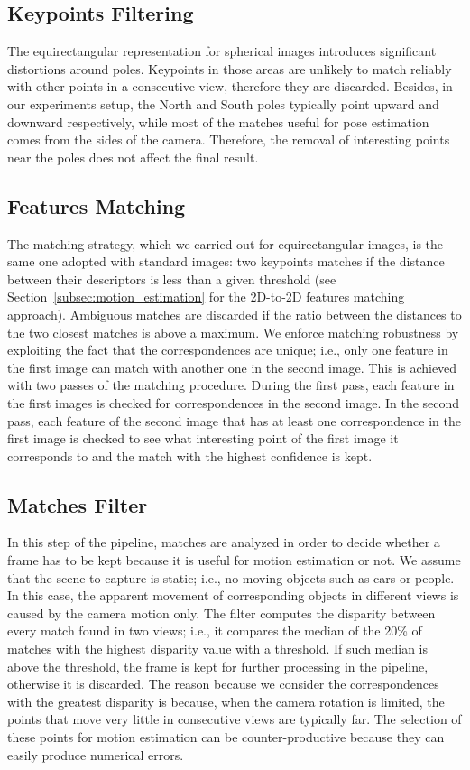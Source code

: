 \subsection{Keypoints Filtering}
The equirectangular representation for spherical images introduces significant 
distortions around poles. Keypoints in those areas 
are unlikely to match reliably with other points in a consecutive view, therefore they are discarded.
Besides, in our experiments setup, the North and South poles typically point 
upward and downward respectively, while most of the matches useful for pose 
estimation comes from the sides of the camera. Therefore, the removal of interesting 
points near the poles does not affect the final result.

\subsection{Features Matching}\label{subsec:feature_matching}
The matching strategy, which we carried out for equirectangular images, is the same one 
adopted with standard images: two keypoints matches if the distance between 
their descriptors is less than a given threshold
(see Section~\ref{subsec:motion_estimation} for the 2D-to-2D features matching
approach). Ambiguous matches 
are discarded if the ratio between the distances to the two closest matches is 
above a maximum.
We enforce matching robustness by exploiting the fact that the correspondences are unique; i.e., only one feature in the first image can match with another one in the second image. This is achieved with two passes of the matching procedure. During the 
first pass, each feature in the first images is checked for correspondences in
the second image. In the second pass, each feature of the second image that 
has at least one correspondence in the first image is checked to see what 
interesting point of the first image it corresponds to and the match with the
highest confidence is kept.

\subsection{Matches Filter}
In this step of the pipeline, matches are analyzed in order to decide 
whether a frame has to be kept because it is useful for motion estimation or
not.
%
We assume that the scene to capture is static; i.e., no moving objects such as cars or people. In this case, the apparent movement of corresponding objects in different views is caused by the camera motion only.
%
The filter computes the disparity between every match found in two views; i.e., 
it compares the median of the 20\% of matches with the highest 
disparity value with a threshold. If such median is above 
the threshold, the frame is kept for further processing in the pipeline, 
otherwise it is discarded.
%
The reason because we consider the correspondences with the greatest disparity is 
because, when the camera rotation is limited, the points that move very little 
in consecutive views are typically far. The selection of these points for motion 
estimation can be counter-productive because they can easily produce numerical 
errors. 

